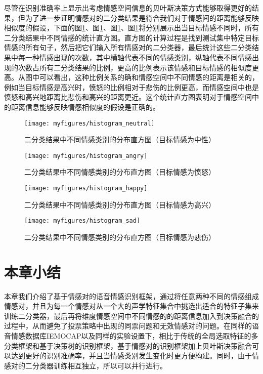 尽管在识别准确率上显示出考虑情感空间信息的贝叶斯决策方式能够取得更好的结果，但为了进一步证明情感对的二分类结果是符合我们对于情感间的距离能够反映相似度的假设，下面的图\ref{fig:histogram_neutral}、图\ref{fig:histogram_neutral}、图\ref{fig:histogram_neutral}、图\ref{fig:histogram_neutral}将分别展示出当目标情感不同时，所有二分类结果中不同情感的统计直方图。直方图的计算过程是找到测试集中特定目标情感的所有句子，然后把它们输入所有情感对的二分类器，最后统计这些二分类结果中每一种情感出现的次数，其中横轴代表不同的情感类别，纵轴代表不同情感出现的次数占所有二分类结果的比例，更高的比例表示该情感和目标情感的相似度更高。从图中可以看出，这种比例关系的确和情感空间中不同情感的距离是相关的，例如当目标情感是高兴时，愤怒的比例相对于悲伤的比例更高，而情感空间中也是愤怒和高兴地距离比悲伤和高兴的距离更近。这个统计直方图表明对于情感空间中的距离信息能够反映情感相似度的假设是正确的。

\begin{figure}[htb] %
    \centering
    \texttt{[image: myfigures/histogram\_neutral]}
    \caption{二分类结果中不同情感类别的分布直方图（目标情感为中性）}
    \label{fig:histogram_neutral}
\end{figure}

\begin{figure}[htb] %
    \centering
    \texttt{[image: myfigures/histogram\_angry]}
    \caption{二分类结果中不同情感类别的分布直方图（目标情感为愤怒）}
    \label{fig:histogram_angry}
\end{figure}

\begin{figure}[htb] %
    \centering
    \texttt{[image: myfigures/histogram\_happy]}
    \caption{二分类结果中不同情感类别的分布直方图（目标情感为高兴）}
    \label{fig:histogram_happy}
\end{figure}

\begin{figure}[htb] %
    \centering
    \texttt{[image: myfigures/histogram\_sad]}
    \caption{二分类结果中不同情感类别的分布直方图（目标情感为悲伤）}
    \label{fig:histogram_sad}
\end{figure}

\section{本章小结}
\label{sec:emo_pair_summary}

本章我们介绍了基于情感对的语音情感识别框架，通过将任意两种不同的情感组成情感对，并且为每一个情感对从一个大的声学特征集合中挑选出适合的特征子集来训练二分类器，最后再将维度情感空间中不同情感的的距离信息加入到决策融合的过程中，从而避免了投票策略中出现的同票问题和无效情感对的问题。在同样的语音情感数据库IEMOCAP以及同样的实验设置下，相比于传统的全局选取特征的多分类框架和基于决策树的识别框架，基于情感对的识别框架加上贝叶斯决策融合可以达到更好的识别准确率，并且当情感类别发生变化时更方便构建。同时，由于情感对的二分类器训练相互独立，所以可以并行进行。
